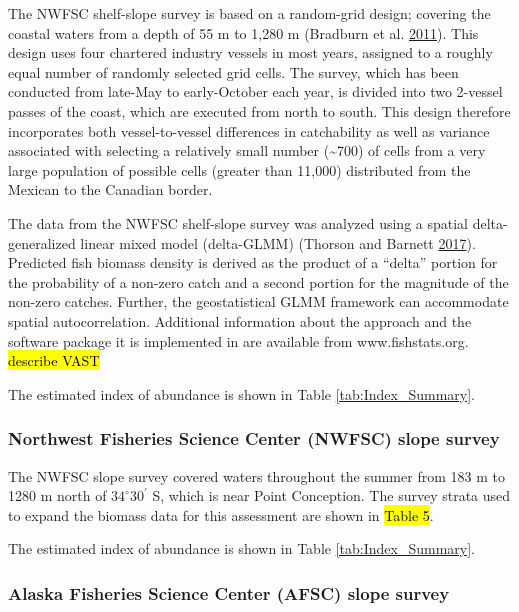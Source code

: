 \documentclass[12pt,]{article}
\begin{document}
The NWFSC shelf-slope survey is based on a random-grid design; covering
the coastal waters from a depth of 55 m to 1,280 m (Bradburn et al.
\protect\hyperlink{ref-bradburn_2003_2011}{2011}). This design uses four
chartered industry vessels in most years, assigned to a roughly equal
number of randomly selected grid cells. The survey, which has been
conducted from late-May to early-October each year, is divided into two
2-vessel passes of the coast, which are executed from north to south.
This design therefore incorporates both vessel-to-vessel differences in
catchability as well as variance associated with selecting a relatively
small number (\textasciitilde{}700) of cells from a very large
population of possible cells (greater than 11,000) distributed from the
Mexican to the Canadian border.

The data from the NWFSC shelf-slope survey was analyzed using a spatial
delta-generalized linear mixed model (delta-GLMM) (Thorson and Barnett
\protect\hyperlink{ref-thorson_comparing_2017}{2017}). Predicted fish
biomass density is derived as the product of a ``delta'' portion for the
probability of a non-zero catch and a second portion for the magnitude
of the non-zero catches. Further, the geostatistical GLMM framework can
accommodate spatial autocorrelation. Additional information about the
approach and the software package it is implemented in are available
from www.fishstats.org. \hl{describe VAST}

The estimated index of abundance is shown in Table
\ref{tab:Index_Summary}.

\subsubsection{Northwest Fisheries Science Center (NWFSC) slope
survey}\label{northwest-fisheries-science-center-nwfsc-slope-survey}

The NWFSC slope survey covered waters throughout the summer from 183 m
to 1280 m north of \(34^\circ 30^\prime\) S, which is near Point
Conception. The survey strata used to expand the biomass data for this
assessment are shown in \hl{Table 5}.

The estimated index of abundance is shown in Table
\ref{tab:Index_Summary}.

\subsubsection{Alaska Fisheries Science Center (AFSC) slope
survey}\label{alaska-fisheries-science-center-afsc-slope-survey}
\end{document}
